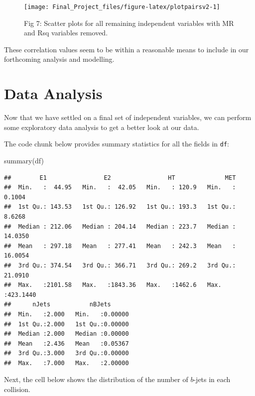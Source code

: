 \documentclass[
]{article}
\newenvironment{Shaded}{\begin{snugshade}}{\end{snugshade}}
\newcommand{\FunctionTok}[1]{\textcolor[rgb]{0.00,0.00,0.00}{#1}}
\newcommand{\NormalTok}[1]{#1}
\begin{document}
\begin{figure}

{\centering \texttt{[image: Final\_Project\_files/figure-latex/plotpairsv2-1]} 

}

\caption{Fig 7: Scatter plots for all remaining independent variables with MR and Rsq variables removed.}\label{fig:plotpairsv2}
\end{figure}

These correlation values seem to be within a reasonable means to include
in our forthcoming analysis and modelling.

\hypertarget{data-analysis}{%
\section{Data Analysis}\label{data-analysis}}

Now that we have settled on a final set of independent variables, we can
perform some exploratory data analysis to get a better look at our data.

The code chunk below provides summary statistics for all the fields in
\texttt{df}:

\begin{Shaded}
\begin{Highlighting}[]
\FunctionTok{summary}\NormalTok{(df)}
\end{Highlighting}
\end{Shaded}

\begin{verbatim}
##        E1                E2                HT              MET          
##  Min.   :  44.95   Min.   :  42.05   Min.   : 120.9   Min.   :  0.1004  
##  1st Qu.: 143.53   1st Qu.: 126.92   1st Qu.: 193.3   1st Qu.:  8.6268  
##  Median : 212.06   Median : 204.14   Median : 223.7   Median : 14.0350  
##  Mean   : 297.18   Mean   : 277.41   Mean   : 242.3   Mean   : 16.0054  
##  3rd Qu.: 374.54   3rd Qu.: 366.71   3rd Qu.: 269.2   3rd Qu.: 21.0910  
##  Max.   :2101.58   Max.   :1843.36   Max.   :1462.6   Max.   :423.1440  
##      nJets           nBJets       
##  Min.   :2.000   Min.   :0.00000  
##  1st Qu.:2.000   1st Qu.:0.00000  
##  Median :2.000   Median :0.00000  
##  Mean   :2.436   Mean   :0.05367  
##  3rd Qu.:3.000   3rd Qu.:0.00000  
##  Max.   :7.000   Max.   :2.00000
\end{verbatim}

Next, the cell below shows the distribution of the number of \(b\)-jets
in each collision.
\end{document}
